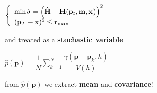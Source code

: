 {\begin{columns}[c]
\begin{block}{}
		$\left\{\begin{array}{l}\mathrm{min}\, \delta = \left( \hat{\mathbf{H}} - \mathbf{H}(\mathbf{p}_t, \mathbf{m}, \mathbf{x}) \right)^2 \\ (\mathbf{p}_T-\mathbf{x})^2 \leq \mathbf{r}_{\mathrm{max}}\end{array}\right.$
		\vspace{0.5cm}
		
		and treated as a \textbf{stochastic variable}
		\vspace{1cm}
		
		$\hat{p}(\mathbf{p}) = \dfrac{1}{N}\sum\limits_{k=1}^{N} \dfrac{\gamma(\mathbf{p}-\mathbf{p}_k,h)}{V(h)}$

		\vspace{1cm}
		from $\hat{p}(\mathbf{p})$ we extract \textbf{mean} and \textbf{covariance}!
		\vspace{1.175cm}
	\end{block}
	\end{columns}
}